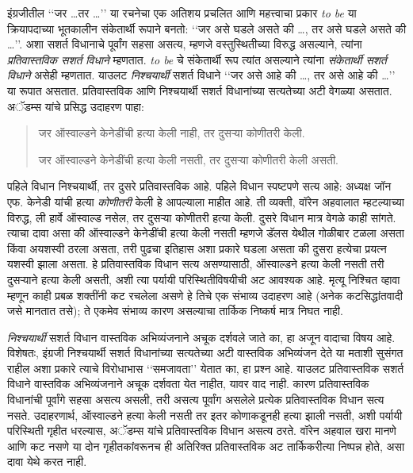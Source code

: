 \documentclass[../../../include/open-logic-section]{subfiles}
\begin{document}


इंग्रजीतील ‘‘जर \dots तर \dots’’
या रचनेचा एक अतिशय प्रचलित आणि
महत्त्वाचा प्रकार \emph{to be}
या क्रियापदाच्या भूतकालीन
संकेतार्थी रूपाने बनतो:
‘‘जर असे घडले असते की \dots,
तर असे घडले असते की \dots’’.
अशा सशर्त विधानाचे पूर्वांग
सहसा असत्य, म्हणजे वस्तुस्थितीच्या
विरुद्ध असल्याने, त्यांना
\emph{प्रतिवास्तविक सशर्त विधाने}
म्हणतात. \emph{to be} चे
संकेतार्थी रूप त्यांत असल्याने
त्यांना \emph{संकेतार्थी सशर्त विधाने}
असेही म्हणतात. याउलट
\emph{निश्चयार्थी} सशर्त विधाने
‘‘जर असे आहे की \dots,
तर असे आहे की \dots’’
या रूपात असतात. प्रतिवास्तविक
आणि निश्चयार्थी सशर्त विधानांच्या
सत्यतेच्या अटी वेगळ्या असतात.
अॅडम्स यांचे प्रसिद्ध उदाहरण पाहा:
\begin{quote}
  जर ऑस्वाल्डने केनेडींची हत्या केली नाही,
  तर दुसऱ्या कोणीतरी केली.

  जर ऑस्वाल्डने केनेडींची हत्या केली
  नसती, तर दुसऱ्या कोणीतरी केली असती.
\end{quote}
पहिले विधान निश्चयार्थी, तर दुसरे
प्रतिवास्तविक आहे. पहिले विधान
स्पष्टपणे सत्य आहे: अध्यक्ष जॉन
एफ. केनेडी यांची हत्या
\emph{कोणीतरी} केली हे आपल्याला
माहीत आहे. ती व्यक्ती,
वॉरेन अहवालात म्हटल्याच्या विरुद्ध,
ली हार्वे ऑस्वाल्ड नसेल,
तर दुसऱ्या कोणीतरी हत्या
केली. दुसरे विधान मात्र
वेगळे काही सांगते. त्याचा
दावा असा की ऑस्वाल्डने
केनेडींची हत्या केली नसती
म्हणजे डॅलस येथील गोळीबार
टळला असता किंवा अयशस्वी
ठरला असता, तरी पुढचा
इतिहास अशा प्रकारे घडला
असता की दुसरा हत्येचा
प्रयत्न यशस्वी झाला असता.
हे प्रतिवास्तविक विधान सत्य असण्यासाठी, ऑस्वाल्डने
हत्या केली नसती तरी दुसऱ्याने हत्या केली असती,
अशी त्या पर्यायी परिस्थितीविषयीची अट आवश्यक आहे.
मृत्यू निश्चित व्हावा म्हणून काही प्रबळ शक्तींनी
कट रचलेला असणे हे तिचे एक संभाव्य उदाहरण आहे
(अनेक कटसिद्धांतवादी जसे मानतात तसे); ते एकमेव
संभाव्य कारण असल्याचा तार्किक निष्कर्ष मात्र निघत नाही.

\emph{निश्चयार्थी} सशर्त विधान
वास्तविक अभिव्यंजनाने अचूक
दर्शवले जाते का, हा अजून
वादाचा विषय आहे. विशेषतः,
इंग्रजी निश्चयार्थी सशर्त
विधानांच्या सत्यतेच्या अटी
वास्तविक अभिव्यंजन देते
या मताशी सुसंगत राहील
अशा प्रकारे त्याचे
विरोधाभास ‘‘समजावता’’
येतात का, हा प्रश्न
आहे. याउलट प्रतिवास्तविक
सशर्त विधाने वास्तविक
अभिव्यंजनाने अचूक
दर्शवता येत नाहीत,
यावर वाद नाही.
कारण प्रतिवास्तविक
विधानांची पूर्वांगे
सहसा असत्य असली,
तरी असत्य पूर्वांग
असलेले प्रत्येक
प्रतिवास्तविक विधान
सत्य नसते. उदाहरणार्थ,
ऑस्वाल्डने हत्या केली नसती तर इतर कोणाकडूनही
हत्या झाली नसती, अशी पर्यायी परिस्थिती गृहीत धरल्यास,
अॅडम्स यांचे प्रतिवास्तविक विधान असत्य ठरते.
वॉरेन अहवाल खरा मानणे आणि कट नसणे या दोन
गृहीतकांवरूनच ही अतिरिक्त प्रतिवास्तविक अट
तार्किकरीत्या निष्पन्न होते, असा दावा येथे करत नाही.
\end{document}
